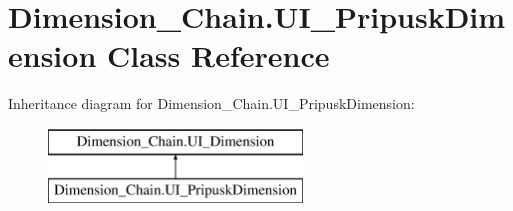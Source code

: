 \hypertarget{class_dimension___chain_1_1_u_i___pripusk_dimension}{}\section{Dimension\+\_\+\+Chain.\+U\+I\+\_\+\+Pripusk\+Dimension Class Reference}
\label{class_dimension___chain_1_1_u_i___pripusk_dimension}
Inheritance diagram for Dimension\+\_\+\+Chain.\+U\+I\+\_\+\+Pripusk\+Dimension\+:\begin{figure}[H]
\begin{center}
\leavevmode
\includegraphics[height=2.000000cm]{class_dimension___chain_1_1_u_i___pripusk_dimension}
\end{center}
\end{figure}
